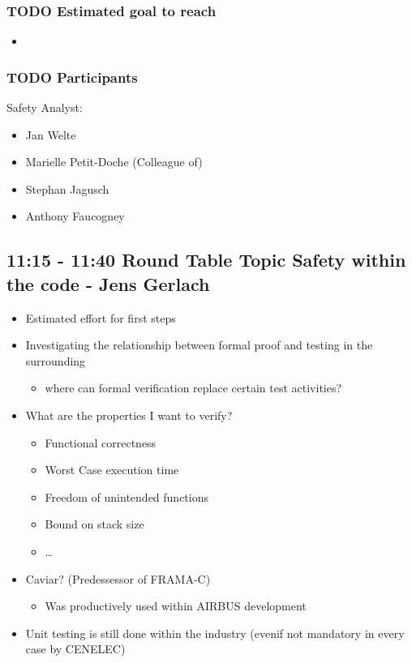 \documentclass[a4paper,german]{article}
\begin{document}
\subsubsection{\textbf{TODO} Estimated goal to reach}
\label{sec-1-5-2}

\begin{itemize}
\item 
\end{itemize}
\subsubsection{\textbf{TODO} Participants}
\label{sec-1-5-3}

     Safety Analyst:
\begin{itemize}
\item Jan Welte
\item Marielle Petit-Doche (Colleague of)
\item Stephan Jagusch
\item Anthony Faucogney
\end{itemize}
\subsection{11:15 - 11:40 Round Table Topic Safety within the code - Jens Gerlach}
\label{sec-1-6}

\begin{itemize}
\item Estimated effort for first steps
\item Investigating the relationship between formal proof and testing in the surrounding
\begin{itemize}
\item where can formal verification replace certain test activities?
\end{itemize}
\item What are the properties I want to verify?
\begin{itemize}
\item Functional correctness
\item Worst Case execution time
\item Freedom of unintended functions
\item Bound on stack size
\item \ldots{}
\end{itemize}
\item Caviar? (Predessessor of FRAMA-C)
\begin{itemize}
\item Was productively used within AIRBUS development
\end{itemize}
\item Unit testing is still done within the industry (evenif not mandatory in every case by CENELEC)
\end{itemize}
\end{document}
